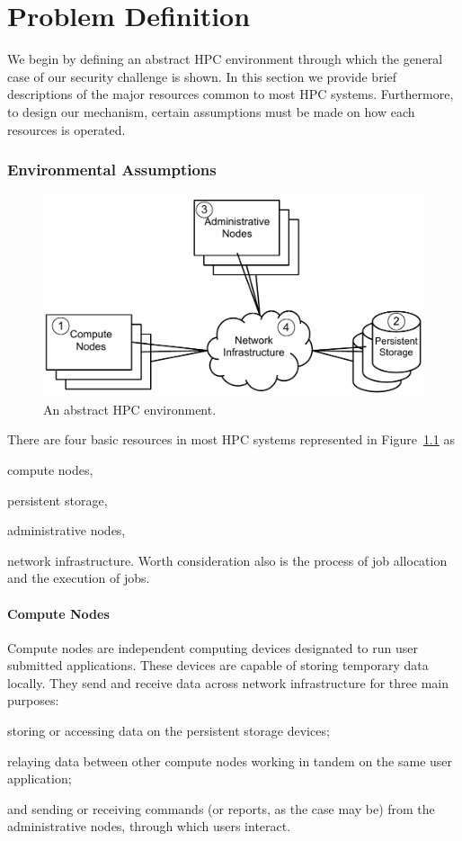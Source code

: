 \documentclass[oneside,12pt]{memoir}
\begin{document}
\chapter{Problem Definition}
We begin by defining an abstract HPC environment through which the general case of our security challenge is shown. In this section we provide brief descriptions of the major resources common to most HPC systems. Furthermore, to design our mechanism, certain assumptions must be made on how each resources is operated. 

\subsection{Environmental Assumptions}
\begin{figure}
\centering
\includegraphics[scale=0.5]{abstract_hpc_environment.pdf}
\caption{An abstract HPC environment.}
\label{fig:abstract_hpc_environment}
\end{figure}
There are four basic resources in most HPC systems represented in Figure~\ref{fig:abstract_hpc_environment} as \begin{inparaenum}
\item compute nodes, \item persistent storage, \item administrative nodes, \item network infrastructure. Worth consideration also is the process of job allocation and the execution of jobs.\end{inparaenum}
\subsubsection{Compute Nodes}
Compute nodes are independent computing devices designated to run user submitted applications. These devices are capable of storing temporary data locally. They send and receive data across network infrastructure for three main purposes:\begin{inparaenum}
\item storing or accessing data on the persistent storage devices;
\item relaying data between other compute nodes working in tandem on the same user application;
\item and sending or receiving commands (or reports, as the case may be) from the administrative nodes, through which users interact.\end{inparaenum} 
\end{document}
